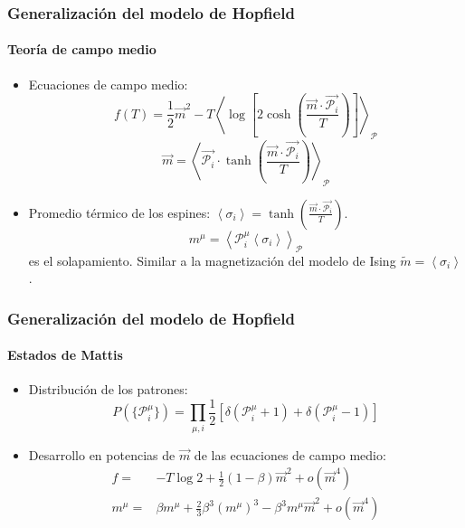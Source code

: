 \documentclass[11pt]{beamer}
\begin{document}
\begin{frame}
\frametitle{Generalización del modelo de Hopfield}
\framesubtitle{Teoría de campo medio}
\begin{itemize}
	\item Ecuaciones de campo medio:
	\begin{displaymath}
	f(T)=\frac{1}{2}\vec{m}^2 - T\left<\log\left[2\cosh\left(\frac{\vec{m}\cdot\vec{\mathcal{P}_i}}{T}\right)\right]\right>_{\mathcal{P}}
	\end{displaymath}
	\begin{displaymath}
	\vec{m}=\left<\vec{\mathcal{P}_i}\cdot\tanh\left(\frac{\vec{m}\cdot\vec{\mathcal{P}_i}}{T}\right)\right>_{\mathcal{P}}
	\end{displaymath}
	\item Promedio térmico de los espines: $\left<\sigma_i\right>=\tanh\left(\frac{\vec{m}\cdot\vec{\mathcal{P}_i}}{T}\right)$.
	\begin{displaymath}
	m^\mu=\left<\mathcal{P}^\mu_i{\left<\sigma_i\right>}\right>_{\mathcal{P}}
	\end{displaymath}
	es el solapamiento. Similar a la magnetización del modelo de Ising $\tilde{m}=\left<\sigma_i\right>$.
\end{itemize}
\end{frame}

\begin{frame}
\frametitle{Generalización del modelo de Hopfield}
\framesubtitle{Estados de Mattis}
\begin{itemize}
	\item Distribución de los patrones:
	\begin{displaymath}
	P(\lbrace\mathcal{P}^\mu_i\rbrace)=\prod_{\mu,i}\frac{1}{2}\left[\delta(\mathcal{P}^\mu_i + 1) + \delta(\mathcal{P}^\mu_i - 1)\right]
	\end{displaymath}
	\item Desarrollo en potencias de $\vec{m}$ de las ecuaciones de campo medio:
	\begin{align*}
	f=&-T\log 2 + \frac{1}{2}(1 - \beta)\vec{m}^2 + o(\vec{m}^4) \label{fseries}\\ m^\mu=&\beta m^\mu + \frac{2}{3}\beta^3 (m^\mu)^3 - \beta^3m^\mu\vec{m}^2 + o(\vec{m}^4)
	\end{align*}
\end{itemize}
\end{frame}
\end{document}
